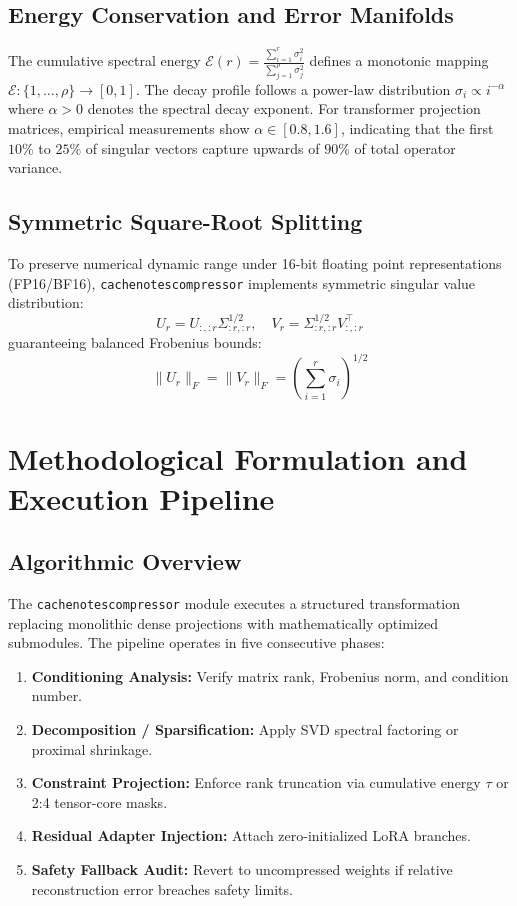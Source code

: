 \subsection{Energy Conservation and Error Manifolds}
The cumulative spectral energy $\mathcal{E}(r) = \frac{\sum_{i=1}^r \sigma_i^2}{\sum_{j=1}^\rho \sigma_j^2}$ defines a monotonic mapping $\mathcal{E}: \{1, \dots, \rho\} \to [0, 1]$. The decay profile follows a power-law distribution $\sigma_i \propto i^{-\alpha}$ where $\alpha > 0$ denotes the spectral decay exponent. For transformer projection matrices, empirical measurements show $\alpha \in [0.8, 1.6]$, indicating that the first $10\%$ to $25\%$ of singular vectors capture upwards of $90\%$ of total operator variance.

\subsection{Symmetric Square-Root Splitting}
To preserve numerical dynamic range under 16-bit floating point representations (FP16/BF16), \texttt{cachenotescompressor} implements symmetric singular value distribution:
\[
U_r = U_{:, :r} \Sigma_{:r, :r}^{1/2}, \quad V_r = \Sigma_{:r, :r}^{1/2} V_{:, :r}^\top
\]
guaranteeing balanced Frobenius bounds:
\[
\|U_r\|_F = \|V_r\|_F = \left( \sum_{i=1}^{r} \sigma_i \right)^{1/2}
\]


\section{Methodological Formulation and Execution Pipeline}

\subsection{Algorithmic Overview}
The \texttt{cachenotescompressor} module executes a structured transformation replacing monolithic dense projections with mathematically optimized submodules. The pipeline operates in five consecutive phases:
\begin{enumerate}
\item \textbf{Conditioning Analysis:} Verify matrix rank, Frobenius norm, and condition number.
\item \textbf{Decomposition / Sparsification:} Apply SVD spectral factoring or proximal shrinkage.
\item \textbf{Constraint Projection:} Enforce rank truncation via cumulative energy $\tau$ or 2:4 tensor-core masks.
\item \textbf{Residual Adapter Injection:} Attach zero-initialized LoRA branches.
\item \textbf{Safety Fallback Audit:} Revert to uncompressed weights if relative reconstruction error breaches safety limits.
\end{enumerate}

